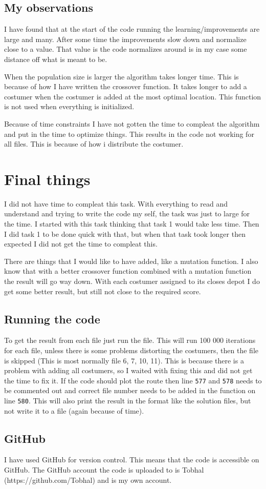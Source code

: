 \documentclass[10pt]{article}
\begin{document}
    \subsection{My observations}
    I have found that at the start of the code running the learning/improvements are large and many. After some time the improvements slow down and normalize close to a value. That value is the code normalizes around is in my case some distance off what is meant to be.

    When the population size is larger the algorithm takes longer time. This is because of how I have written the crossover function. It takes longer to add a costumer when the costumer is added at the most optimal location. This function is not used when everything is initialized.

    Because of time constraints I have not gotten the time to compleat the algorithm and put in the time to optimize things. This results in the code not working for all files. This is because of how i distribute the costumer. 

    \section{Final things}
    I did not have time to compleat this task. With everything to read and understand and trying to write the code my self, the task was just to large for the time. I started with this task thinking that task 1 would take less time. Then I did task 1 to be done quick with that, but when that task took longer then expected I did not get the time to compleat this.
    
    There are things that I would like to have added, like a mutation function. I also know that with a better crossover function combined with a mutation function the result will go way down. With each costumer assigned to its closes depot I do get some better result, but still not close to the required score.

    \subsection{Running the code}
    To get the result from each file just run the file. This will run 100 000 iterations for each file, unless there is some problems distorting the costumers, then the file is skipped (This is most normally file 6, 7, 10, 11). This is because there is a problem with adding all costumers, so I waited with fixing this and did not get the time to fix it.
    If the code should plot the route then line \texttt{577} and \texttt{578} needs to be commented out and correct file number needs to be added in the function on line \texttt{580}. This will also print the result in the format like the solution files, but not write it to a file (again because of time).

    \subsection{GitHub}
    I have used GitHub for version control. This means that the code is accessible on GitHub. The GitHub account the code is uploaded to is Tobhal (https://github.com/Tobhal) and is my own account.
\end{document}
